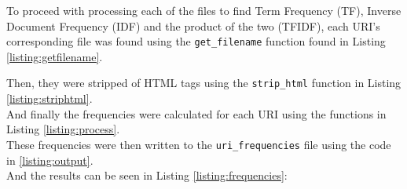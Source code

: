 To proceed with processing each of the files to find Term Frequency (TF), Inverse Document Frequency (IDF) and the product of the two (TFIDF), each URI's corresponding file was found using the {\tt get\_filename} function found in Listing \ref{listing:getfilename}.\\



\newpage

Then, they were stripped of HTML tags using the {\tt strip\_html} function in Listing \ref{listing:striphtml}.\\



And finally the frequencies were calculated for each URI using the functions in Listing \ref{listing:process}.\\



These frequencies were then written to the {\tt uri\_frequencies} file using the code in \ref{listing:output}.\\



\newpage
And the results can be seen in Listing \ref{listing:frequencies}:\\

